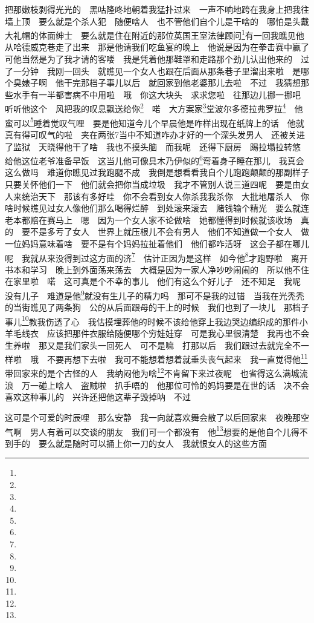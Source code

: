 \par 把那嫩枝剥得光光的　黑咕隆咚地朝着我猛扑过来　一声不响地跨在我身上把我往墙上顶　要么就是个杀人犯　随便啥人　也不管他们自个儿是干啥的　哪怕是头戴大礼帽的体面绅士　要么就是住在附近的那位英国王室法律顾问\footnote{}有一回我瞧见他从哈德威克巷走了出来　那是他请我们吃鱼宴的晚上　他说是因为在拳击赛中赢了　可他当然是为了我才请的客喽　我是凭着他那鞋罩和走路那个劲儿认出他来的　过了一分钟　我刚一回头　就瞧见一个女人也跟在后面从那条巷子里溜出来啦　是哪个臭婊子啊　他干完那档子事儿以后　就回家到他老婆那儿去啦　不过　我猜想那些水手有一半都害病不中用啦　哦　你这大块头　求求您啦　往那边儿挪一挪吧　听听他这个　风把我的叹息飘送给你\footnote{}　喏　大方案家\footnote{}堂波尔多德拉弗罗拉\footnote{}　他蛮可以\footnote{}睡着觉叹气哩　要是他知道今儿个早晨他是咋样出现在纸牌上的话　他就真有得可叹气的啦　夹在两张7当中不知道咋办才好的一个深头发男人　还被关进了监狱　天晓得他干了啥　我也不摸头脑　而我呢　还得下厨房　踢拉塌拉转悠　给他这位老爷准备早饭　这当儿他可像具木乃伊似的\footnote{}弯着身子睡在那儿　我真会这么做吗　难道你瞧见过我跑腿不成　我倒是想看看我自个儿跑跑颠颠的那副样子　只要关怀他们一下　他们就会把你当成垃圾　我才不管别人说三道四呢　要是由女人来统治天下　那该有多好哇　你不会看到女人你杀我我杀你　大批地屠杀人　你啥时候瞧见过女人像他们那么喝得烂醉　到处滚来滚去　赌钱输个精光　要么就连老本都赔在赛马上　嗯　因为一个女人家不论做啥　她都懂得到时候就该收场　真的　要不是多亏了女人　世界上就压根儿不会有男人　他们不知道做一个女人　做一位妈妈意味着啥　要不是有个妈妈拉扯着他们　他们都咋活呀　这会子都在哪儿呢　我就从来没得到过这方面的济\footnote{}　估计正因为是这样　如今他\footnote{}才跑野啦　离开书本和学习　晚上到外面荡来荡去　大概是因为一家人净吵吵闹闹的　所以他不住在家里啦　喏　这可真是个不幸的事儿　他们有这么个好儿子　还不知足　我呢　没有儿子　难道是他\footnote{}就没有生儿子的精力吗　那可不是我的过错　当我在光秃秃的当街瞧见了两条狗　公的从后面跟母的干上的时候　我们也到了一块儿　那档子事儿\footnote{}教我伤透了心　我估摸埋葬他的时候不该给他穿上我边哭边编织成的那件小羊毛线衣　应该把那件衣服给随便哪个穷娃娃穿　可是我心里很清楚　我再也不会生养啦　那又是我们家头一回死人　可不是嘛　打那以后　我们跟过去就完全不一样啦　哦　不要再想下去啦　我可不能想着想着就垂头丧气起来　我一直觉得他\footnote{}带回家来的是个古怪的人　我纳闷他为啥\footnote{}不肯留下来过夜呢　也省得这么满城流浪　万一碰上啥人　盗贼啦　扒手唔的　他那位可怜的妈妈要是在世的话　决不会喜欢这种事儿的　兴许还把他这辈子毁掉呐　不过　
\par 这可是个可爱的时辰哩　那么安静　我一向就喜欢舞会散了以后回家来　夜晚那空气啊　男人有着可以交谈的朋友　我们可一个都没有　他\footnote{}想要的是他自个儿得不到手的　要么就是随时可以捅上你一刀的女人　我就恨女人的这些方面　
